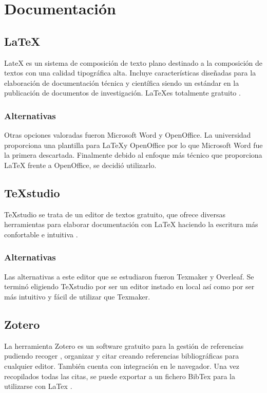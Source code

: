 \section{Documentación}\label{Documentación}
	\subsection{\LaTeX}\label{LaTex}
LateX es un sistema de composición de texto plano destinado a la composición de textos con una calidad tipográfica alta. Incluye características diseñadas para la elaboración de documentación técnica y científica siendo un estándar en la publicación de documentos de investigación. \LaTeX es totalmente gratuito \cite{latex}.
	\subsubsection{Alternativas}\label{AlternativasLatex}
Otras opciones valoradas fueron Microsoft Word y OpenOffice. La universidad proporciona una plantilla para \LaTeX y OpenOffice por lo que Microsoft Word fue la primera descartada. Finalmente debido al enfoque más técnico que proporciona LaTeX frente a OpenOffice, se decidió utilizarlo.

	\subsection{\TeX studio}\label{Texmaker}
TeXstudio se trata de un editor de textos gratuito, que ofrece diversas herramientas para elaborar documentación con LaTeX haciendo la escritura más confortable e intuitiva \cite{texstudio}.
	\subsubsection{Alternativas}\label{AlternativasTexmaker}
Las alternativas a este editor que se estudiaron fueron Texmaker y Overleaf. Se terminó eligiendo TeXstudio por ser un editor instado en local así como por ser más intuitivo y fácil de utilizar que Texmaker.

	\subsection{Zotero}\label{zotero}
La herramienta Zotero es un software gratuito para la gestión de referencias pudiendo recoger , organizar y citar creando referencias bibliográficas para cualquier editor. También cuenta con integración en le navegador. Una vez recopilados todas las citas, se puede exportar a un fichero BibTex para la utilizarse con LaTex \cite{zotero}.

